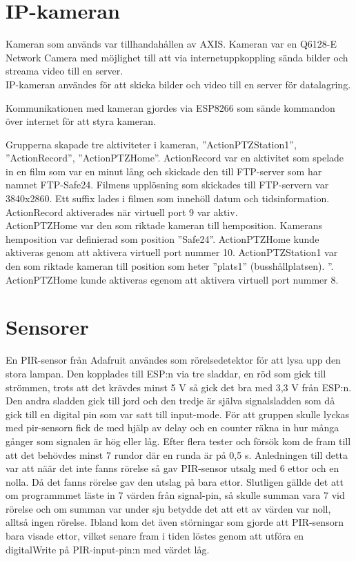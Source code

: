 \section{IP-kameran}
Kameran som används var tillhandahållen av AXIS. Kameran var en Q6128-E Network Camera med möjlighet till att via  internetuppkoppling sända bilder och streama video till en server.\\

IP-kameran användes för att skicka bilder och video till en server för datalagring.

Kommunikationen med kameran gjordes via ESP8266 som sände kommandon över internet för att styra kameran.

Grupperna skapade tre aktiviteter i kameran, ”ActionPTZStation1”, ”ActionRecord”, ”ActionPTZHome”.
ActionRecord var en aktivitet som spelade in en film som var en minut lång och skickade den till FTP-server som har namnet FTP-Safe24. Filmens upplösning som skickades till FTP-servern var 3840x2860. Ett suffix lades i filmen som innehöll datum och tidsinformation. ActionRecord aktiverades när virtuell port 9 var aktiv.\\
ActionPTZHome var den som riktade kameran till hemposition. Kamerans hemposition var definierad som position ”Safe24”. ActionPTZHome kunde aktiveras genom att aktivera virtuell port nummer 10.
ActionPTZStation1 var den som riktade kameran till position som heter ”plats1” (busshållplatsen). ”. ActionPTZHome kunde aktiveras egenom att aktivera virtuell port nummer 8.


\section{Sensorer}
En PIR-sensor från Adafruit användes som rörelsedetektor för att lysa upp den stora lampan. Den kopplades till ESP:n via tre sladdar, en röd som gick till strömmen, trots att det krävdes minst 5 V så gick det bra med 3,3 V från ESP:n. Den andra sladden gick till jord och den tredje är själva signalsladden som då gick till en digital pin som var satt till input-mode. För att gruppen skulle lyckas med pir-sensorn fick de med hjälp av delay och en counter räkna in hur många gånger som signalen är hög eller låg. Efter flera tester och försök kom de fram till att det behövdes minst 7 rundor där en runda är på 0,5 s. Anledningen till detta var att näär det inte fanns rörelse så gav PIR-sensor utsalg med 6 ettor och en nolla. Då det fanns rörelse gav den utslag på bara ettor. Slutligen gällde det att om programmmet läste in 7 värden från signal-pin, så skulle summan vara 7 vid rörelse och om summan var under sju betydde det att ett av värden var noll, alltså ingen rörelse. Ibland kom det även störningar som gjorde att PIR-sensorn bara visade ettor, vilket senare fram i tiden löstes genom att utföra en digitalWrite på PIR-input-pin:n med värdet låg.  \\

